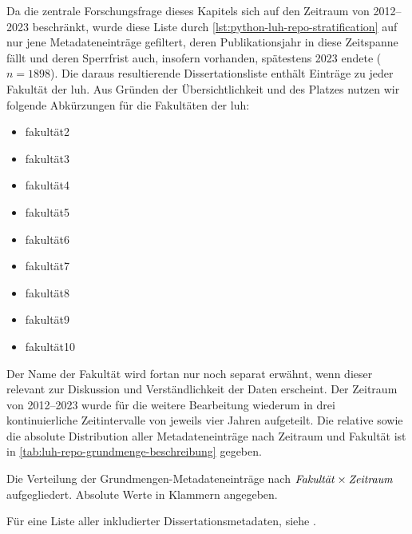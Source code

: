 Da die zentrale Forschungsfrage dieses Kapitels sich auf den Zeitraum von 2012--2023 beschränkt, wurde diese Liste durch \cref{lst:python-luh-repo-stratification} auf nur jene Metadateneinträge gefiltert, deren Publikationsjahr in diese Zeitspanne fällt und deren Sperrfrist auch, insofern vorhanden, spätestens 2023 endete ($n=1898$).
Die daraus resultierende Dissertationsliste enthält Einträge zu jeder Fakultät der \gls{luh}.
Aus Gründen der Übersichtlichkeit und des Platzes nutzen wir folgende Abkürzungen für die Fakultäten der \gls{luh}:
\begin{itemize}
    \item \gls{fakultät2}
    \item \gls{fakultät3}
    \item \gls{fakultät4}
    \item \gls{fakultät5}
    \item \gls{fakultät6}
    \item \gls{fakultät7}
    \item \gls{fakultät8}
    \item \gls{fakultät9}
    \item \gls{fakultät10}
\end{itemize}
Der Name der Fakultät wird fortan nur noch separat erwähnt, wenn dieser relevant zur Diskussion und Verständlichkeit der Daten erscheint.
Der Zeitraum von 2012--2023 wurde für die weitere Bearbeitung wiederum in drei kontinuierliche Zeitintervalle von jeweils vier Jahren aufgeteilt.
Die relative sowie die absolute Distribution aller Metadateneinträge nach Zeitraum und Fakultät ist in \cref{tab:luh-repo-grundmenge-beschreibung} gegeben.
\begin{table}[!htbp]
	\caption{Die Verteilung der Grundmengen-Metadateneinträge nach $\text{\textit{Fakultät}}\times\text{\textit{Zeitraum}}$ aufgegliedert.
    Absolute Werte in Klammern angegeben.}
    
	\label{tab:luh-repo-grundmenge-beschreibung}
\end{table}

\noindent Für eine Liste aller inkludierter Dissertationsmetadaten, siehe .

